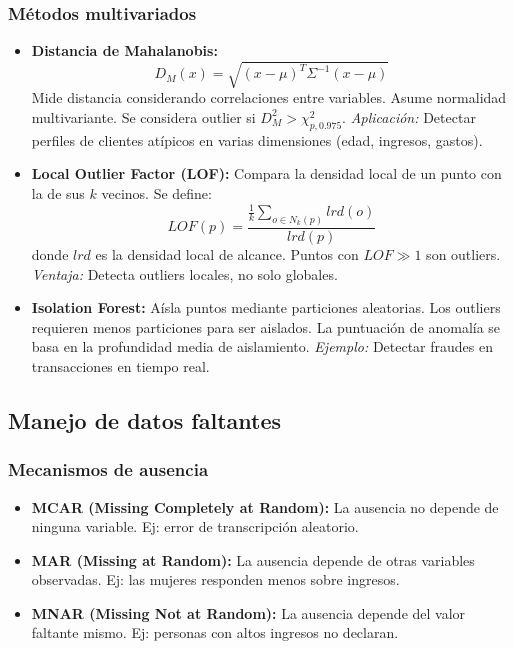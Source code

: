 \documentclass[12pt,a4paper,openany,oneside]{book}
\begin{document}
\subsubsection{Métodos multivariados}
\begin{itemize}
    \item \textbf{Distancia de Mahalanobis:}
    \[
    D_M(x) = \sqrt{(x - \mu)^T \Sigma^{-1} (x - \mu)}
    \]
    Mide distancia considerando correlaciones entre variables. Asume normalidad multivariante. Se considera outlier si $D_M^2 > \chi^2_{p,0.975}$. \textit{Aplicación:} Detectar perfiles de clientes atípicos en varias dimensiones (edad, ingresos, gastos).
    \item \textbf{Local Outlier Factor (LOF):} Compara la densidad local de un punto con la de sus $k$ vecinos. Se define:
    \[
    LOF(p) = \frac{\frac{1}{k}\sum_{o \in N_k(p)} lrd(o)}{lrd(p)}
    \]
    donde $lrd$ es la densidad local de alcance. Puntos con $LOF \gg 1$ son outliers. \textit{Ventaja:} Detecta outliers locales, no solo globales.
    \item \textbf{Isolation Forest:} Aísla puntos mediante particiones aleatorias. Los outliers requieren menos particiones para ser aislados. La puntuación de anomalía se basa en la profundidad media de aislamiento. \textit{Ejemplo:} Detectar fraudes en transacciones en tiempo real.
\end{itemize}

\subsection{Manejo de datos faltantes}

\subsubsection{Mecanismos de ausencia}
\begin{itemize}
    \item \textbf{MCAR (Missing Completely at Random):} La ausencia no depende de ninguna variable. Ej: error de transcripción aleatorio.
    \item \textbf{MAR (Missing at Random):} La ausencia depende de otras variables observadas. Ej: las mujeres responden menos sobre ingresos.
    \item \textbf{MNAR (Missing Not at Random):} La ausencia depende del valor faltante mismo. Ej: personas con altos ingresos no declaran.
\end{itemize}
\end{document}
